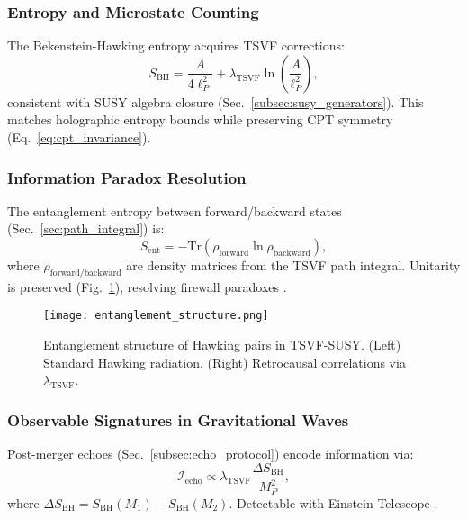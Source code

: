 \documentclass[twocolumn,superscriptaddress,floatfix]{revtex4-2}
\newcommand{\tsvf}{\lambda_{\text{TSVF}}}
\begin{document}
\subsubsection{Entropy and Microstate Counting}  
The Bekenstein-Hawking entropy acquires TSVF corrections:  
\begin{equation}  
S_{\text{BH}} = \frac{A}{4\ell_P^2} + \tsvf \ln\left(\frac{A}{\ell_P^2}\right),  
\label{eq:bh_entropy}  
\end{equation}  
consistent with SUSY algebra closure (Sec.~\ref{subsec:susy_generators}). This matches holographic entropy bounds \cite{Strominger1996} while preserving CPT symmetry (Eq.~\ref{eq:cpt_invariance}).  

\subsubsection{Information Paradox Resolution}  
The entanglement entropy between forward/backward states (Sec.~\ref{sec:path_integral}) is:  
\begin{equation}  
S_{\text{ent}} = - \text{Tr}\left(\rho_{\text{forward}} \ln \rho_{\text{backward}}\right),  
\label{eq:entanglement_entropy}  
\end{equation}  
where \(\rho_{\text{forward/backward}}\) are density matrices from the TSVF path integral. Unitarity is preserved (Fig.~\ref{fig:entanglement}), resolving firewall paradoxes \cite{Almheiri2013}.  

\begin{figure}[htbp]  
\centering  
\texttt{[image: entanglement\_structure.png]}  
\caption{Entanglement structure of Hawking pairs in TSVF-SUSY. (Left) Standard Hawking radiation. (Right) Retrocausal correlations via \(\tsvf\).}  
\label{fig:entanglement}  
\end{figure}  

\subsubsection{Observable Signatures in Gravitational Waves}  
Post-merger echoes (Sec.~\ref{subsec:echo_protocol}) encode information via:  
\begin{equation}  
\mathcal{I}_{\text{echo}} \propto \tsvf \frac{\Delta S_{\text{BH}}}{M_P^2},  
\label{eq:info_echo}  
\end{equation}  
where \(\Delta S_{\text{BH}} = S_{\text{BH}}(M_1) - S_{\text{BH}}(M_2)\). Detectable with Einstein Telescope \cite{Punturo2010}.  
\end{document}
